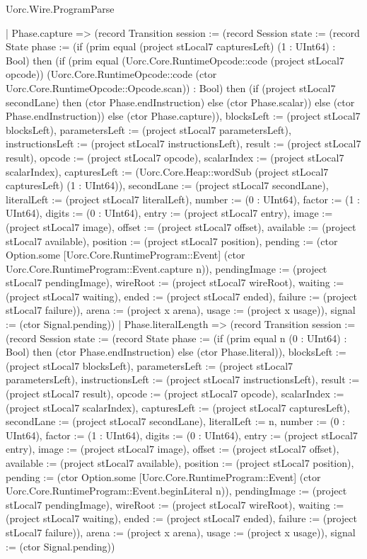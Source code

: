 \begin{lexlean}{Uorc.Wire.ProgramParse}
\begin{semanticmodule}
{    | Phase.capture => (record Transition {session := (record Session {state := (record State {phase := (if (prim equal (project stLocal7 capturesLeft) (1 : UInt64) : Bool) then (if (prim equal (Uorc.Core.RuntimeOpcode::code (project stLocal7 opcode)) (Uorc.Core.RuntimeOpcode::code (ctor Uorc.Core.RuntimeOpcode::Opcode.scan)) : Bool) then (if (project stLocal7 secondLane) then (ctor Phase.endInstruction) else (ctor Phase.scalar)) else (ctor Phase.endInstruction)) else (ctor Phase.capture)), blocksLeft := (project stLocal7 blocksLeft), parametersLeft := (project stLocal7 parametersLeft), instructionsLeft := (project stLocal7 instructionsLeft), result := (project stLocal7 result), opcode := (project stLocal7 opcode), scalarIndex := (project stLocal7 scalarIndex), capturesLeft := (Uorc.Core.Heap::wordSub (project stLocal7 capturesLeft) (1 : UInt64)), secondLane := (project stLocal7 secondLane), literalLeft := (project stLocal7 literalLeft), number := (0 : UInt64), factor := (1 : UInt64), digits := (0 : UInt64), entry := (project stLocal7 entry), image := (project stLocal7 image), offset := (project stLocal7 offset), available := (project stLocal7 available), position := (project stLocal7 position), pending := (ctor Option.some [Uorc.Core.RuntimeProgram::Event] (ctor Uorc.Core.RuntimeProgram::Event.capture n)), pendingImage := (project stLocal7 pendingImage), wireRoot := (project stLocal7 wireRoot), waiting := (project stLocal7 waiting), ended := (project stLocal7 ended), failure := (project stLocal7 failure)}), arena := (project x arena), usage := (project x usage)}), signal := (ctor Signal.pending)})
    | Phase.literalLength => (record Transition {session := (record Session {state := (record State {phase := (if (prim equal n (0 : UInt64) : Bool) then (ctor Phase.endInstruction) else (ctor Phase.literal)), blocksLeft := (project stLocal7 blocksLeft), parametersLeft := (project stLocal7 parametersLeft), instructionsLeft := (project stLocal7 instructionsLeft), result := (project stLocal7 result), opcode := (project stLocal7 opcode), scalarIndex := (project stLocal7 scalarIndex), capturesLeft := (project stLocal7 capturesLeft), secondLane := (project stLocal7 secondLane), literalLeft := n, number := (0 : UInt64), factor := (1 : UInt64), digits := (0 : UInt64), entry := (project stLocal7 entry), image := (project stLocal7 image), offset := (project stLocal7 offset), available := (project stLocal7 available), position := (project stLocal7 position), pending := (ctor Option.some [Uorc.Core.RuntimeProgram::Event] (ctor Uorc.Core.RuntimeProgram::Event.beginLiteral n)), pendingImage := (project stLocal7 pendingImage), wireRoot := (project stLocal7 wireRoot), waiting := (project stLocal7 waiting), ended := (project stLocal7 ended), failure := (project stLocal7 failure)}), arena := (project x arena), usage := (project x usage)}), signal := (ctor Signal.pending)})
}
\end{semanticmodule}
\end{lexlean}
